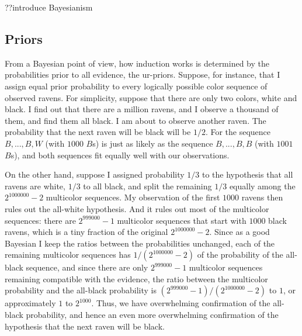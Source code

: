 ??introduce Bayesianism

\subsection{Priors}
From a Bayesian point of view, how induction works is determined by the probabilities prior to all evidence, the ur-priors.
Suppose, for instance, that I assign equal prior probability to every logically possible color sequence of observed ravens. 
For simplicity, suppose that there are only two colors, white and black.  I find out that there are a million ravens, and 
I observe a thousand of them, and find them all black. I am about to observe another raven. The probability that the next 
raven will be black will be $1/2$. For the sequence $B,...,B,W$ (with $1000$ $B$s) is just as likely as the sequence
$B,...,B,B$ (with $1001$ $B$s), and both sequences fit equally well with our observations. 

On the other hand, suppose I assigned probability $1/3$ to the hypothesis that all ravens are white, $1/3$ to all black,
and split the remaining $1/3$ equally among the $2^{1000000}-2$ multicolor sequences. My observation of the first $1000$
ravens then rules out the all-white  hypothesis. And it rules out most of the multicolor sequences: there are $2^{999000}-1$
multicolor sequences that start with $1000$ black ravens, which is a tiny fraction of the original $2^{1000000}-2$. Since as a 
good Bayesian I keep the ratios between the probabilities unchanged, each of the remaining multicolor sequences has 
$1/(2^{1000000}-2)$ of the probability of the all-black sequence, and since there are only $2^{999000}-1$ multicolor
sequences remaining compatible with the evidence, the ratio between the multicolor probability and the all-black probability
is $(2^{999000}-1)/(2^{1000000}-2)$ to $1$, or approximately $1$ to $2^{1000}$. Thus, we have overwhelming confirmation of 
the all-black probability, and hence an even more overwhelming confirmation of the hypothesis that the next raven will be black.

